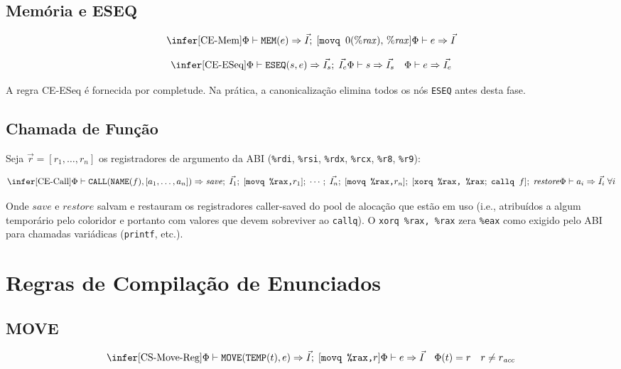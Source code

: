 \subsection{Memória e ESEQ}

\[
  \infer[\text{CE-Mem}]
  {\Phi \vdash \texttt{MEM}(e) \Rightarrow \vec{I};\; [\texttt{movq }
  0(\%\mathit{rax}),\, \%\mathit{rax}]}
  {\Phi \vdash e \Rightarrow \vec{I}}
\]

\[
  \infer[\text{CE-ESeq}]
  {\Phi \vdash \texttt{ESEQ}(s, e) \Rightarrow \vec{I_s};\; \vec{I_e}}
  {\Phi \vdash s \Rightarrow \vec{I_s} \quad \Phi \vdash e
  \Rightarrow \vec{I_e}}
\]

A regra CE-ESeq é fornecida por completude. Na prática, a canonicalização
elimina todos os nós \texttt{ESEQ} antes desta fase.

\subsection{Chamada de Função}

Seja $\vec{r} = [r_1, \ldots, r_n]$ os registradores de argumento da ABI
(\texttt{\%rdi}, \texttt{\%rsi}, \texttt{\%rdx}, \texttt{\%rcx},
\texttt{\%r8}, \texttt{\%r9}):

\[
  \infer[\text{CE-Call}]
  {\Phi \vdash \texttt{CALL}(\texttt{NAME}(f), [a_1, \ldots, a_n])
    \Rightarrow
    \mathit{save};\;
    \vec{I_1};\; [\texttt{movq \%rax,} r_1];\;
    \cdots;\;
    \vec{I_n};\; [\texttt{movq \%rax,} r_n];\;
    [\texttt{xorq \%rax, \%rax};\; \texttt{callq } f];\;
  \mathit{restore}}
  {\Phi \vdash a_i \Rightarrow \vec{I_i}\; \forall i}
\]

Onde $\mathit{save}$ e $\mathit{restore}$ salvam e restauram os
registradores caller-saved do pool de alocação que estão em uso (i.e.,
  atribuídos a algum temporário pelo coloridor e portanto com valores que
devem sobreviver ao \texttt{callq}). O \texttt{xorq \%rax, \%rax} zera
\texttt{\%eax} como exigido pelo ABI para chamadas variádicas
(\texttt{printf}, etc.).

\section{Regras de Compilação de Enunciados}

\subsection{MOVE}

\[
  \infer[\text{CS-Move-Reg}]
  {\Phi \vdash \texttt{MOVE}(\texttt{TEMP}(t), e) \Rightarrow
  \vec{I};\; [\texttt{movq \%rax,} r]}
  {\Phi \vdash e \Rightarrow \vec{I} \quad \Phi(t) = r \quad r \neq
  r_{\mathit{acc}}}
\]

